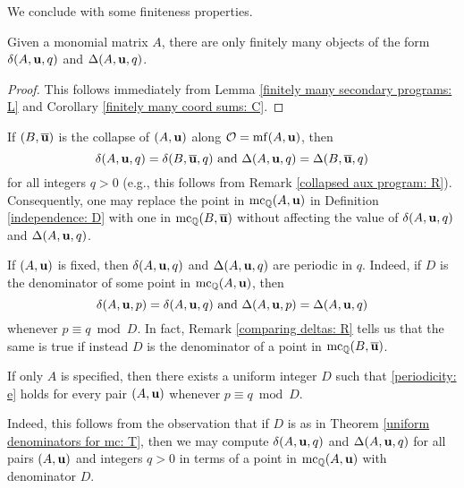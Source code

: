 \documentclass[11pt]{amsart}
\renewcommand{\!}[1]{{\color{red}\text{$\star$\,}#1\,$\star$}}
\newcommand{\ol}[1]{\overline{#1}}
\begin{document}
We conclude with some finiteness properties.

\begin{proposition}
\label{finitely many deltas for a fixed A: P}
 Given a monomial matrix $A$, there are only finitely many objects of the form $\delta(A, \mathbf{u}, q)$ and $\Delta(A, \mathbf{u}, q)$.
\end{proposition}

\begin{proof}
This follows immediately from Lemma \ref{finitely many secondary programs: L} and Corollary \ref{finitely many coord sums: C}.
\end{proof}

\begin{remark}  
\label{comparing deltas: R}
If $(B, \ol{\vv{u}})$ is the collapse of $(A, \mathbf{u})$ along $\mathcal{O} = \operatorname{mf}(A, \mathbf{u})$, then  
\[ \delta(A, \vv{u}, q) = \delta(B, \ol{\vv{u}}, q)  \text{ and }  \Delta(A, \vv{u},q) = \Delta(B, \ol{\vv{u}}, q)\] for all integers $q>0$ (e.g., this follows from Remark \ref{collapsed aux program: R}).   Consequently, one may replace the point in $\operatorname{mc}_{\mathbb{Q}}(A, \mathbf{u})$ in Definition \ref{independence: D}   with one in $\mc_{\QQ}(B, \ol{\vv{u}})$ without affecting the value of $\delta(A, \mathbf{u}, q)$ and $\Delta(A, \mathbf{u}, q)$.
\end{remark}

\begin{remark}
\label{pair periodicity: R}
If $(A, \mathbf{u})$ is fixed, then $\delta(A, \mathbf{u}, q)$ and $\Delta(A, \mathbf{u}, q)$ are periodic in $q$.  Indeed, if $D$ is the denominator of some point in $\operatorname{mc}_{\mathbb{Q}}(A, \mathbf{u})$, then 
\begin{equation}
\label{periodicity: e}
 \delta(A, \mathbf{u}, p) = \delta(A, \mathbf{u}, q)  \text{ and } \Delta(A, \mathbf{u}, p) = \Delta(A, \mathbf{u}, q)
\end{equation} whenever $p \equiv q \bmod D$.    In fact, Remark \ref{comparing deltas: R} tells us that the same is true if instead $D$ is the denominator of a point in $\mc_{\QQ}(B, \ol{\vv{u}})$.
\end{remark}

\begin{remark}
\label{uniform periodicity: R}
 If only $A$ is specified, then there exists a uniform integer $D$ such that \eqref{periodicity: e} holds for every pair $(A, \mathbf{u})$ whenever $p \equiv q \bmod D$.  
 
 Indeed,  this follows from the observation that if $D$ is as in Theorem \ref{uniform denominators for mc:  T}, then we may compute  $\delta(A, \mathbf{u}, q)$ and $\Delta(A, \mathbf{u}, q)$ for all pairs $(A, \mathbf{u})$ and integers $q>0$ in terms of a point in $\operatorname{mc}_{\mathbb{Q}}(A, \mathbf{u})$ with denominator $D$.
\end{remark}
\end{document}
